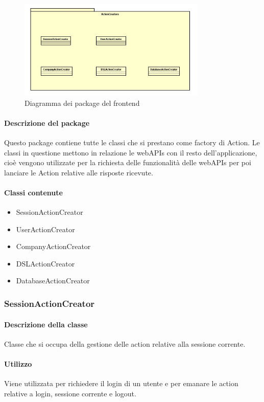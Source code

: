 \begin{figure}[h]
\centering
\includegraphics[width=0.8\textwidth]{res/sections/imgs/actioncreator-diagram.jpg}
\caption{Diagramma dei package del frontend}
\end{figure}


\paragraph*{Descrizione del package}
Questo package contiene tutte le classi che si prestano come factory di Action. Le classi in questione mettono in relazione le webAPIs con il resto dell'applicazione, cioè vengono utilizzate per la richiesta delle funzionalità delle webAPIs per poi lanciare le Action relative alle risposte ricevute.

\paragraph*{Classi contenute}
\begin{itemize}
\item SessionActionCreator
\item UserActionCreator
\item CompanyActionCreator
\item DSLActionCreator
\item DatabaseActionCreator
\end{itemize}

\subsubsection{SessionActionCreator}
\paragraph*{Descrizione della classe}
Classe che si occupa della gestione delle action relative alla sessione corrente.

\paragraph*{Utilizzo}
Viene utilizzata per richiedere il login di un utente e per emanare le action relative a login, sessione corrente e logout.

